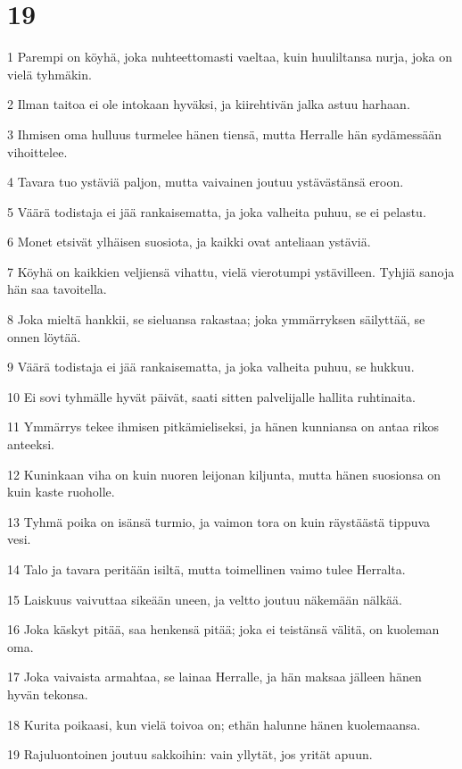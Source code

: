 \chapter{19}

\par 1 Parempi on köyhä, joka nuhteettomasti vaeltaa, kuin huuliltansa nurja, joka on vielä tyhmäkin.
\par 2 Ilman taitoa ei ole intokaan hyväksi, ja kiirehtivän jalka astuu harhaan.
\par 3 Ihmisen oma hulluus turmelee hänen tiensä, mutta Herralle hän sydämessään vihoittelee.
\par 4 Tavara tuo ystäviä paljon, mutta vaivainen joutuu ystävästänsä eroon.
\par 5 Väärä todistaja ei jää rankaisematta, ja joka valheita puhuu, se ei pelastu.
\par 6 Monet etsivät ylhäisen suosiota, ja kaikki ovat anteliaan ystäviä.
\par 7 Köyhä on kaikkien veljiensä vihattu, vielä vierotumpi ystävilleen. Tyhjiä sanoja hän saa tavoitella.
\par 8 Joka mieltä hankkii, se sieluansa rakastaa; joka ymmärryksen säilyttää, se onnen löytää.
\par 9 Väärä todistaja ei jää rankaisematta, ja joka valheita puhuu, se hukkuu.
\par 10 Ei sovi tyhmälle hyvät päivät, saati sitten palvelijalle hallita ruhtinaita.
\par 11 Ymmärrys tekee ihmisen pitkämieliseksi, ja hänen kunniansa on antaa rikos anteeksi.
\par 12 Kuninkaan viha on kuin nuoren leijonan kiljunta, mutta hänen suosionsa on kuin kaste ruoholle.
\par 13 Tyhmä poika on isänsä turmio, ja vaimon tora on kuin räystäästä tippuva vesi.
\par 14 Talo ja tavara peritään isiltä, mutta toimellinen vaimo tulee Herralta.
\par 15 Laiskuus vaivuttaa sikeään uneen, ja veltto joutuu näkemään nälkää.
\par 16 Joka käskyt pitää, saa henkensä pitää; joka ei teistänsä välitä, on kuoleman oma.
\par 17 Joka vaivaista armahtaa, se lainaa Herralle, ja hän maksaa jälleen hänen hyvän tekonsa.
\par 18 Kurita poikaasi, kun vielä toivoa on; ethän halunne hänen kuolemaansa.
\par 19 Rajuluontoinen joutuu sakkoihin: vain yllytät, jos yrität apuun.
